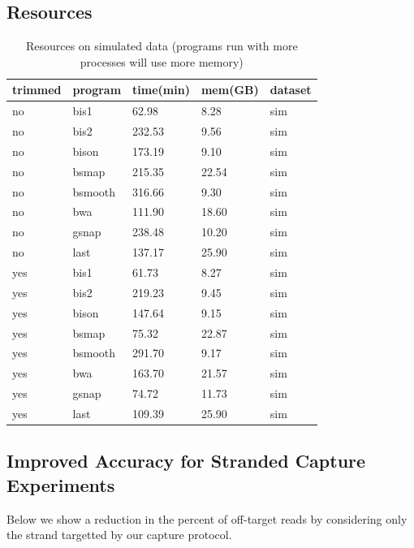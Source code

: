 \documentclass[12pt]{article}
\begin{document}
\subsection{Resources}

\begin{table}[H]
    \centering
    \caption{Resources on simulated data
(programs run with more processes will use more memory)}
    \begin{tabular}{lllll} \hline
    trimmed & program & time(min) & mem(GB) & dataset \\ \hline

no &    bis1 & 62.98 & 8.28 & sim \\
no &    bis2 & 232.53 & 9.56 & sim \\
no &    bison & 173.19 & 9.10 & sim \\
no &    bsmap & 215.35 & 22.54 & sim \\
no &    bsmooth & 316.66 & 9.30 & sim \\
no &    bwa & 111.90 & 18.60 & sim \\
no &    gsnap & 238.48 & 10.20 & sim \\
no &    last & 137.17 & 25.90 & sim \\

yes &    bis1 & 61.73 & 8.27 & sim \\
yes &    bis2 & 219.23 & 9.45 & sim \\
yes &    bison & 147.64 & 9.15 & sim \\
yes &    bsmap & 75.32 & 22.87 & sim \\
yes &    bsmooth & 291.70 & 9.17 & sim \\
yes &    bwa & 163.70 & 21.57 & sim \\
yes &    gsnap & 74.72 & 11.73 & sim \\
yes &    last & 109.39 & 25.90 & sim \\

    \end{tabular}
\end{table}

\subsection{Improved Accuracy for Stranded Capture Experiments}

Below we show a reduction in the percent of off-target reads by
considering only the strand targetted by our capture protocol.
\end{document}

